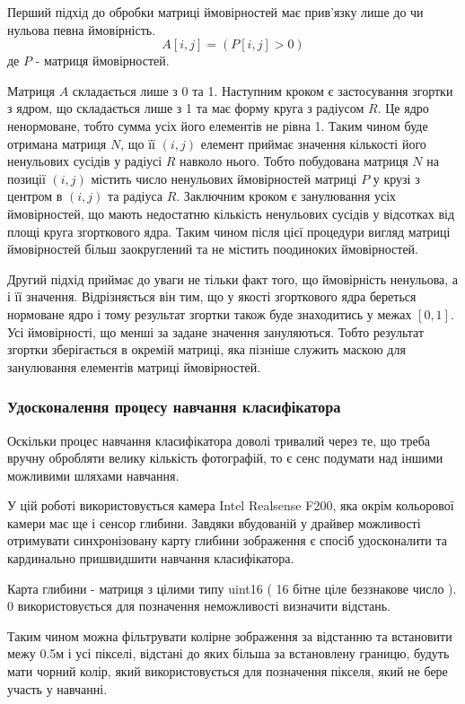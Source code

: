 Перший підхід до обробки матриці ймовірностей має прив'язку лише до чи нульова певна ймовірність.
\begin{equation}
	A[i,j] = ( P[i,j] > 0 )
\end{equation}
де $P$ - матриця ймовірностей.

Матриця $A$ складається лише з 0 та 1. Наступним кроком є застосування згортки з ядром, що складається лише з 1 та має форму круга з радіусом $R$. Це ядро ненормоване, тобто сумма усіх його елементів не рівна 1. Таким чином буде отримана матриця $N$, що її $(i,j)$ елемент приймає значення кількості його ненульових сусідів у радіусі $R$ навколо нього. Тобто побудована матриця $N$ на позиції $(i,j)$ містить число ненульових ймовірностей матриці $P$ у крузі з центром в $(i,j)$ та радіуса $R$. Заключним кроком є занулювання усіх ймовірностей, що мають недостатню кількість ненульових сусідів у відсотках від площі круга згорткового ядра. Таким чином після цієї процедури вигляд матриці ймовірностей більш заокруглений та не містить поодиноких ймовірностей.

Другий підхід приймає до уваги не тільки факт того, що ймовірність ненульова, а і її значення.
Відрізняється він тим, що у якості згорткового ядра береться нормоване ядро і тому результат згортки також буде знаходитись у межах $[0,1]$. Усі ймовірності, що менші за задане значення зануляються. Тобто результат згортки зберігається в окремій матриці, яка пізніше служить маскою для занулювання елементів матриці ймовірностей.
\subsubsection{Удосконалення процесу навчання класифікатора}

Оскільки процес навчання класифікатора доволі тривалий через те, що треба вручну обробляти велику кількість фотографій, то є сенс подумати над іншими можливими шляхами навчання.

У цій роботі використовується камера Intel Realsense F200, яка окрім кольорової камери має ще і сенсор глибини. Завдяки вбудованій у драйвер можливості отримувати синхронізовану карту глибини зображення є спосіб удосконалити та кардинально пришвидшити навчання класифікатора.

Карта глибини - матриця з цілими типу uint16 ( 16 бітне ціле беззнакове число ). 0 використовується для позначення неможливості визначити відстань.

Таким чином можна фільтрувати колірне зображення за відстанню та встановити межу 0.5м і усі пікселі, відстані до яких більша за встановлену границю, будуть мати чорний колір, який використовується для позначення пікселя, який не бере участь у навчанні.

